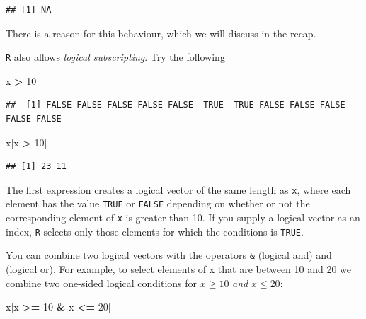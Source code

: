 \documentclass[
]{book}
\newenvironment{Shaded}{\begin{snugshade}}{\end{snugshade}}
\newcommand{\DecValTok}[1]{\textcolor[rgb]{0.00,0.00,0.81}{#1}}
\newcommand{\NormalTok}[1]{#1}
\newcommand{\SpecialCharTok}[1]{\textcolor[rgb]{0.81,0.36,0.00}{\textbf{#1}}}
\theoremstyle{definition}
\theoremstyle{definition}
\theoremstyle{definition}
\theoremstyle{definition}
\theoremstyle{remark}
\begin{document}
\begin{verbatim}
## [1] NA
\end{verbatim}

There is a reason for this behaviour, which we will discuss in the recap.

\texttt{R} also allows \emph{logical subscripting}. Try the following

\begin{Shaded}
\begin{Highlighting}[]
\NormalTok{x }\SpecialCharTok{\textgreater{}} \DecValTok{10}
\end{Highlighting}
\end{Shaded}

\begin{verbatim}
##  [1] FALSE FALSE FALSE FALSE FALSE  TRUE  TRUE FALSE FALSE FALSE FALSE FALSE
\end{verbatim}

\begin{Shaded}
\begin{Highlighting}[]
\NormalTok{x[x }\SpecialCharTok{\textgreater{}} \DecValTok{10}\NormalTok{]}
\end{Highlighting}
\end{Shaded}

\begin{verbatim}
## [1] 23 11
\end{verbatim}

The first expression creates a logical vector of the same length as
\texttt{x}, where each element has the value \texttt{TRUE} or
\texttt{FALSE} depending on whether or not the corresponding element
of \texttt{x} is greater than 10. If you supply a logical vector as an
index, \texttt{R} selects only those elements for which the conditions is
\texttt{TRUE}.

You can combine two logical vectors with the operators \texttt{\&}
(logical and) and \texttt{\textbar{}} (logical or). For example, to select
elements of x that are between 10 and 20 we combine two one-sided logical
conditions for \(x \geq 10\) \emph{and} \(x \leq 20\):

\begin{Shaded}
\begin{Highlighting}[]
\NormalTok{x[x }\SpecialCharTok{\textgreater{}=} \DecValTok{10} \SpecialCharTok{\&}\NormalTok{ x }\SpecialCharTok{\textless{}=} \DecValTok{20}\NormalTok{]}
\end{Highlighting}
\end{Shaded}
\end{document}
